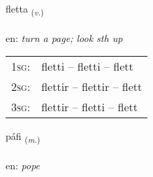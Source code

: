 \documentclass[frontgrid, backgrid]{flacards}\usepackage[]{graphicx}\usepackage[]{xcolor}
\begin{document}
\renewcommand{\flhead}{\vskip5pt \fboxsep=0pt {\small\bfseries\footnotesize Sagnorð | Verb}}
\renewcommand{\fcfoot}{\vskip5pt \fboxsep=0pt \hspace{2pt}{\small\bfseries\footnotesize 3K}}

\renewcommand{\blhead}{\vskip5pt {\small\bfseries\footnotesize Sagnorð | Verb }}
\renewcommand{\bcfoot}{\vskip5pt \hspace{2pt}{\small\bfseries\footnotesize 3K}}


{fletta \small{\textsubscript{(\textit{v.})}} \\[1ex] %
\textphonetic{[flɛhta]} \\
en: \emph{turn a page; look sth up} \\  [2ex]
\renewcommand*{\arraystretch}{0.8}
\begin{tabular}{p{1cm}l}
\textsc{1sg}: & fletti -- fletti -- flett \\ 
\textsc{2sg}: & flettir -- flettir -- flett \\ 
\textsc{3sg}: & flettir -- fletti -- flett \\ 
\end{tabular}
}

\renewcommand{\flhead}{\vskip5pt \fboxsep=0pt {\small\bfseries\footnotesize Nafnorð | Noun}}
\renewcommand{\fcfoot}{\vskip5pt \fboxsep=0pt \hspace{2pt}{\small\bfseries\footnotesize 3K}}

\renewcommand{\blhead}{\vskip5pt {\small\bfseries\footnotesize Nafnorð | Noun }}
\renewcommand{\bcfoot}{\vskip5pt \hspace{2pt}{\small\bfseries\footnotesize 3K}}


{páfi \small{\textsubscript{(\textit{m.})}} \\[1ex] %
\textphonetic{[pʰauːvɪ]} \\
en: \emph{pope} \\  [2ex]
\renewcommand*{\arraystretch}{0.8}
}
\end{document}
